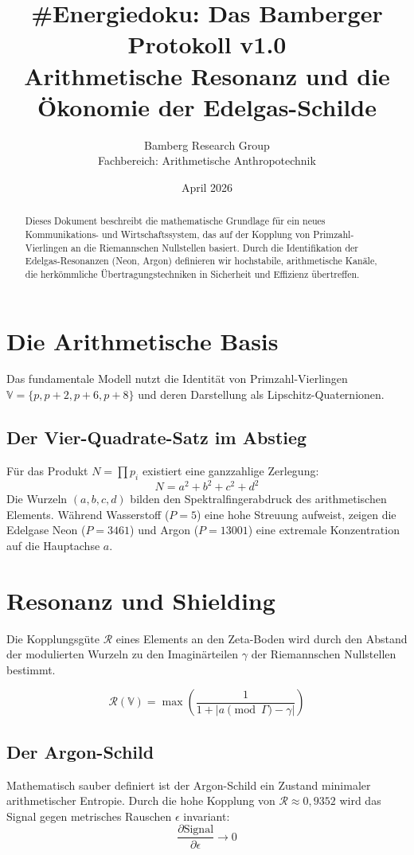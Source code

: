 \documentclass[12pt,a4paper]{article}
\title{\textbf{\#Energiedoku: Das Bamberger Protokoll v1.0} \\ 
	\large Arithmetische Resonanz und die Ökonomie der Edelgas-Schilde}
\author{Bamberg Research Group \\ Fachbereich: Arithmetische Anthropotechnik}
\date{April 2026}
\begin{document}
	
	\maketitle
	
	\begin{abstract}
		Dieses Dokument beschreibt die mathematische Grundlage für ein neues Kommunikations- und Wirtschaftssystem, das auf der Kopplung von Primzahl-Vierlingen an die Riemannschen Nullstellen basiert. Durch die Identifikation der Edelgas-Resonanzen (Neon, Argon) definieren wir hochstabile, arithmetische Kanäle, die herkömmliche Übertragungstechniken in Sicherheit und Effizienz übertreffen.
	\end{abstract}
	
	\section{Die Arithmetische Basis}
	Das fundamentale Modell nutzt die Identität von Primzahl-Vierlingen $\mathbb{V} = \{p, p+2, p+6, p+8\}$ und deren Darstellung als Lipschitz-Quaternionen.
	
	\subsection{Der Vier-Quadrate-Satz im Abstieg}
	Für das Produkt $N = \prod p_i$ existiert eine ganzzahlige Zerlegung:
	\begin{equation}
		N = a^2 + b^2 + c^2 + d^2
	\end{equation}
	Die Wurzeln $(a, b, c, d)$ bilden den Spektralfingerabdruck des arithmetischen Elements. Während Wasserstoff ($P=5$) eine hohe Streuung aufweist, zeigen die Edelgase Neon ($P=3461$) und Argon ($P=13001$) eine extremale Konzentration auf die Hauptachse $a$.
	
	\section{Resonanz und Shielding}
	Die Kopplungsgüte $\mathcal{R}$ eines Elements an den Zeta-Boden wird durch den Abstand der modulierten Wurzeln zu den Imaginärteilen $\gamma$ der Riemannschen Nullstellen bestimmt.
	
	\begin{equation}
		\mathcal{R}(\mathbb{V}) = \max \left( \frac{1}{1 + |a \pmod{\Gamma} - \gamma|} \right)
	\end{equation}
	
	\subsection{Der Argon-Schild}
	Mathematisch sauber definiert ist der Argon-Schild ein Zustand minimaler arithmetischer Entropie. Durch die hohe Kopplung von $\mathcal{R} \approx 0,9352$ wird das Signal gegen metrisches Rauschen $\epsilon$ invariant:
	\begin{equation}
		\frac{\partial \text{Signal}}{\partial \epsilon} \rightarrow 0
	\end{equation}
	
\end{document}
